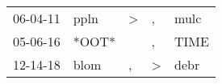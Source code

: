 \begin{supertabular}{lllll}
 06-04-11 &   ppln &  \textgreater &             , &  mulc \\
 05-06-16 &  *OOT* &               &             , &  TIME \\
 12-14-18 &   blom &             , &  \textgreater &  debr \\
\end{supertabular}
